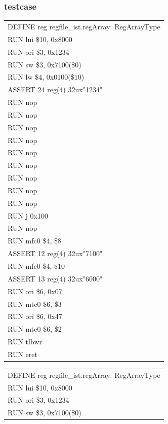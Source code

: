 \documentclass[11pt,utf8]{article}
\begin{document}
{{{\subsubsection{testcase} {
\begin{center}	\begin{longtable}{p{15cm}} \hline
		DEFINE{ }reg{ }regfile\_ist.regArray:{ }RegArrayType\\
		RUN{ }lui{ }\$10,{ }0x8000\\
		RUN{ }ori{ }\$3,{ }0x1234\\
		RUN{ }sw{ }{ }\$3,{ }0x7100(\$0)\\
		RUN{ }lw{ }{ }\$4,{ }0x0100(\$10)\\
		ASSERT{ }24{ }reg(4){ }32ux"1234"\\
		RUN{ }nop\\
		RUN{ }nop\\
		RUN{ }nop\\
		RUN{ }nop\\
		RUN{ }nop\\
		RUN{ }nop\\
		RUN{ }nop\\
		RUN{ }nop\\
		RUN{ }nop\\
		RUN{ }j{ }0x100\\
		RUN{ }nop\\
		RUN{ }mfc0{ }\$4,{ }\$8\\
		ASSERT{ }12{ }reg(4){ }32ux"7100"\\
		RUN{ }mfc0{ }\$4,{ }\$10\\
		ASSERT{ }13{ }reg(4){ }32ux"6000"\\
		RUN{ }ori{ }\$6,{ }0x07\\
		RUN{ }mtc0{ }\$6,{ }\$3\\
		RUN{ }ori{ }\$6,{ }0x47\\
		RUN{ }mtc0{ }\$6,{ }\$2\\
		RUN{ }tlbwr\\
		RUN{ }eret\\
		\hline \end{longtable} \end{center}
\begin{center}	\begin{longtable}{p{15cm}} \hline
		DEFINE{ }reg{ }regfile\_ist.regArray:{ }RegArrayType\\
		RUN{ }lui{ }\$10,{ }0x8000\\
		RUN{ }ori{ }\$3,{ }0x1234\\
		RUN{ }sw{ }{ }\$3,{ }0x7100(\$0)\\

\end{longtable}
\end{center}}}}}
\end{document}
